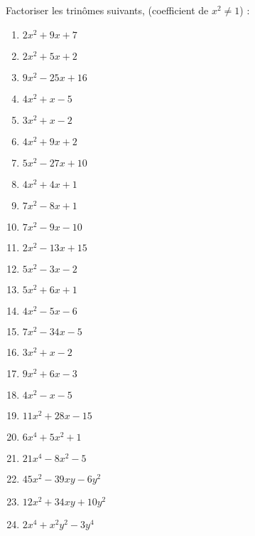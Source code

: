 \begin{exercice} Factoriser les trinômes suivants, (coefficient de $x^2\neq 1$) :
\begin{multicols}{2}
\begin{enumerate}
\item $2{{x}^{2}}+9x+7$
\item $2{{x}^{2}}+5x+2$
\item $9{{x}^{2}}-25x+16$
\item $4{{x}^{2}}+x-5$
\item $3{{x}^{2}}+x-2$
\item $4{{x}^{2}}+9x+2$
\item $5{{x}^{2}}-27x+10$
\item $4{{x}^{2}}+4x+1$
\item $7{{x}^{2}}-8x+1$
\item $7{{x}^{2}}-9x-10$
\item $2{{x}^{2}}-13x+15$
\item $5{{x}^{2}}-3x-2$
\item $5{{x}^{2}}+6x+1$
\item $4{{x}^{2}}-5x-6$
\item $7{{x}^{2}}-34x-5$
\item $3{{x}^{2}}+x-2$
\item $9{{x}^{2}}+6x-3$
\item $4{{x}^{2}}-x-5$
\item $11{{x}^{2}}+28x-15$
\item $6{{x}^{4}}+5{{x}^{2}}+1$
\item $21{{x}^{4}}-8{{x}^{2}}-5$
\item $45{{x}^{2}}-39xy-6{{y}^{2}}$
\item $12{{x}^{2}}+34xy+10{{y}^{2}}$
\item $2{{x}^{4}}+{{x}^{2}}{{y}^{2}}-3{{y}^{4}}$
\end{enumerate}
\end{multicols}
\end{exercice}

